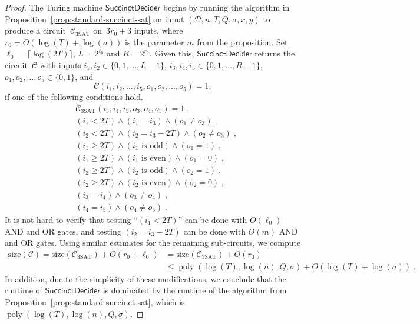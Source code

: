 \documentclass[11pt]{article}
\theoremstyle{definition}
\DeclareMathOperator{\poly}{poly}
\newcommand{\decider}{\mathcal{D}}
\newcommand{\succinctdecider}{\ensuremath{\mathsf{SuccinctDecider}}}
\newcommand{\circuit}{\mathcal{C}}
\newcommand{\qlen}{Q}
\begin{document}
\begin{proof}
  The Turing machine $\succinctdecider$ begins by running the algorithm in
  Proposition~\ref{prop:standard-succinct-sat} on input
  $(\decider,n,T,\qlen,\sigma, x,y)$ to produce a
  circuit~$\circuit_{\mathrm{3SAT}}$ on~$3r_0+3$ inputs, where $r_0 =
  O(\log(T)+\log(\sigma))$ is the parameter $m$ from the proposition.
  Set $\ell_0 = \lceil \log(2T) \rceil$, $L = 2^{\ell_0}$ and $R = 2^{r_0}$.
  Given this, $\succinctdecider$ returns the circuit~$\circuit$ with inputs
  $i_1, i_2 \in \{0, 1, \ldots, L-1\}$, $i_3, i_4, i_5 \in \{0, 1, \ldots,
  R-1\}$, $o_1, o_2, \ldots, o_5 \in \{0, 1\}$, and
  \[
    \circuit(i_1, i_2, \ldots, i_5, o_1, o_2, \ldots, o_5) = 1,
  \]
  if one of the following conditions hold.
  \begin{align*}
    & \circuit_{\mathrm{3SAT}}(i_3, i_4, i_5, o_3, o_4, o_5) = 1\;,\\
    & (i_1 < 2T) \land (i_1 = i_3) \land (o_1 \neq o_3)\;,\\
    & (i_2 < 2T)\land (i_2 = i_3 - 2T) \land (o_2 \neq o_3)\;,\\
    & (i_1 \geq 2T) \land (\text{$i_1$ is odd}) \land (o_1 = 1)\;,\\
    & (i_1 \geq 2T) \land (\text{$i_1$ is even}) \land (o_1 = 0)\;,\\
    & (i_2 \geq 2T) \land (\text{$i_2$ is odd}) \land (o_2 = 1)\;,\\
    & (i_2 \geq 2T) \land (\text{$i_2$ is even}) \land (o_2 = 0)\;,\\
    & (i_3 = i_4) \land (o_3 \neq o_4)\;,\\
    & (i_4 = i_5) \land (o_4 \neq o_5)\;.
  \end{align*}
  It is not hard to verify that testing ``$(i_1 < 2T)$'' can be done with
  $O(\ell_0)$ AND and OR gates, and testing $(i_2 = i_3 - 2T)$ can be done with
  $O(m)$ AND and OR gates.
  Using similar estimates for the remaining sub-circuits, we compute
  \begin{equation*}
    \begin{split}
      \mathrm{size}(\circuit) = \mathrm{size}(\circuit_{\mathrm{3SAT}}) +
      O(r_0 + \ell_0) & = \mathrm{size}(\circuit_{\mathrm{3SAT}}) + O(r_0) \\
      & \leq \poly(\log(T), \log(n), \qlen,\sigma) + O(\log(T) + \log(\sigma))\;.
    \end{split}
  \end{equation*}
  In addition, due to the simplicity of these modifications, we conclude that
  the runtime of $\succinctdecider$ is dominated by the runtime of the algorithm
  from Proposition~\ref{prop:standard-succinct-sat}, which is $\poly(\log(T),
  \log(n), \qlen,\sigma)$.


\end{proof}
\end{document}
